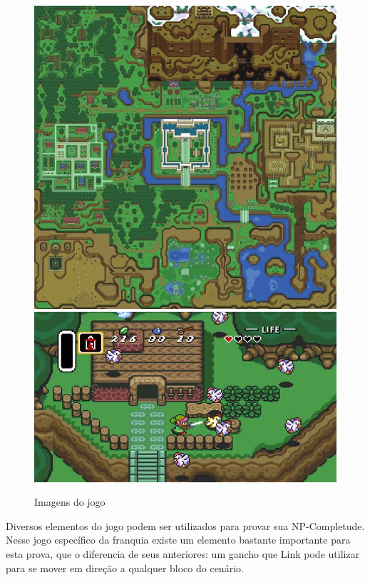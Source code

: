 \begin{figure}[!htb]
     \centering
     \includegraphics[scale=0.3]{zelda.jpg}
     \includegraphics[scale=0.3]{link.jpg}
     \caption{Imagens do jogo}
\end{figure}

Diversos elementos do jogo podem ser utilizados para provar sua NP-Completude. Nesse jogo específico da franquia existe
um elemento bastante importante para esta prova, que o diferencia de seus anteriores: um gancho que Link pode utilizar
para se mover em direção a qualquer bloco do cenário.

